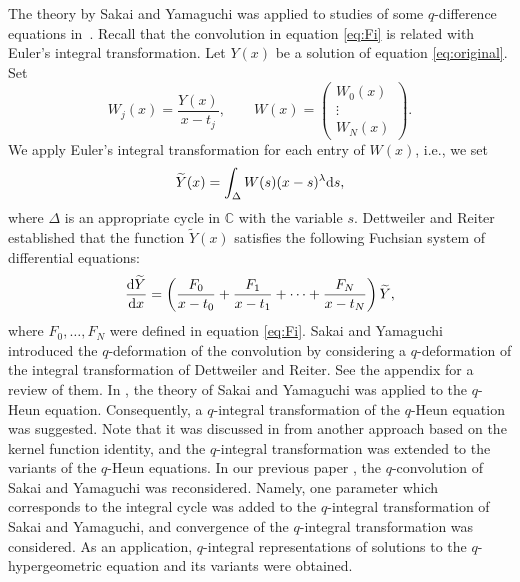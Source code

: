 \documentclass[pdftex]{sigma}
\numberwithin{equation}{section}
\theoremstyle{definition}
\begin{document}
The theory by Sakai and Yamaguchi was applied to studies of some $q$-difference equations in~\mbox{\cite{AT, STT}}.
Recall that the convolution in equation \eqref{eq:Fi} is related with Euler's integral transformation.
Let $Y(x)$ be a solution of equation \eqref{eq:original}.
Set
\begin{equation*}
W_{j}(x) = \frac{Y(x)}{x - t_{j}}, \qquad
W(x) =
\left(
\begin{matrix}
W_{0}(x) \\
\vdots \\
W_{N}(x)
\end{matrix}
\right).
\end{equation*}
We apply Euler's integral transformation for each entry of $W(x)$, i.e., we set
\begin{equation*}
\widetilde{Y} (x) = \int_{\Delta}W(s)(x - s)^{\lambda}{\rm d}s ,
\end{equation*}
where $\Delta $ is an appropriate cycle in $\mathbb{C} $ with the variable $s$.
Dettweiler and Reiter \cite{DR1} established that the function $\widetilde{Y} (x)$ satisfies the following Fuchsian system of differential equations:
\[%
\frac{{\rm d}\widetilde{Y}}{{\rm d}x} = \left( \frac{F_0}{x-t_0}+\frac{F_1}{x-t_1}+\dots + \frac{F_N}{x-t_N} \right)\widetilde{Y} ,
\]
where $F_0, \dots , F_N$ were defined in equation \eqref{eq:Fi}.
Sakai and Yamaguchi \cite{SY} introduced the $q$\nobreakdash-deformation of the convolution by considering a $q$-deformation of the integral transformation of Dettweiler and Reiter.
See the appendix for a review of them.
In \cite{STT}, the theory of Sakai and Yamaguchi was applied to the $q$-Heun equation.
Consequently, a $q$-integral transformation of the $q$-Heun equation was suggested.
Note that it was discussed in \cite{Tki} from another approach based on the kernel function identity, and the $q$-integral transformation was extended to the variants of the $q$-Heun equations.
In our previous paper \cite{AT}, the $q$-convolution of Sakai and Yamaguchi was reconsidered.
Namely, one parameter which corresponds to the integral cycle was added to the $q$-integral transformation of Sakai and Yamaguchi, and convergence of the $q$-integral transformation was considered.
As an application, $q$-integral representations of solutions to the $q$-hypergeometric equation and its variants were obtained.
\end{document}
